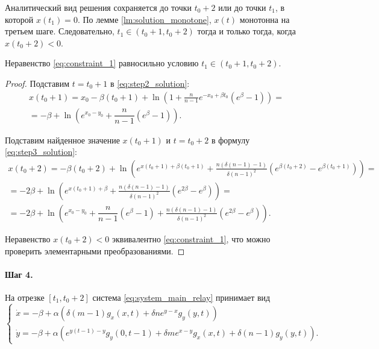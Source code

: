 Аналитический вид решения сохраняется до точки $t_0 + 2$ или до точки $t_1$, в которой $x(t_1) = 0$. По лемме \ref{lm:solution_monotone}, $x(t)$ монотонна на третьем шаге. Следовательно, $t_1 \in (t_0 + 1, t_0 + 2)$ тогда и только тогда, когда $x(t_0 + 2) < 0$.

\begin{lemma}
	\label{lm:t1_one_step}
	Неравенство \eqref{eq:constraint_1} равносильно условию $t_1 \in (t_0 + 1, t_0 + 2)$.
\end{lemma}
\begin{proof}
	Подставим $t = t_0 + 1$ в \eqref{eq:step2_solution}:
	\begin{multline*}
		x(t_0 + 1) = x_0 - \beta (t_0 + 1) + \ln\left(1 + \frac{n}{n - 1} e^{-x_0 + \beta t_0}  (e^{\beta} - 1)\right) =\\= -\beta + \ln\left(e^{x_0 - y_0} + \dfrac{n}{n - 1}(e^{\beta} - 1)\right).
	\end{multline*}
	
	Подставим найденное значение $x(t_0 + 1)$ и $t = t_0 + 2$ в формулу \eqref{eq:step3_solution}:
	\small
	\begin{multline*}
		x(t_0 + 2) = -\beta (t_0 + 2) + \ln\left(e^{x(t_0 + 1) + \beta (t_0 + 1)} + \frac{n (\delta(n - 1) - 1)}{\delta (n - 1)^2} (e^{\beta (t_0 + 2)} - e^{\beta (t_0 + 1)})\right) = \\ = -2\beta + \ln\left(e^{x(t_0 + 1) + \beta} + \frac{n (\delta(n - 1) - 1)}{\delta (n - 1)^2} (e^{2\beta} - e^{\beta})\right) = \\ = -2\beta + \ln\left(e^{x_0 - y_0} + \dfrac{n}{n - 1}(e^{\beta} - 1) + \frac{n (\delta(n - 1) - 1)}{\delta (n - 1)^2} (e^{2\beta} - e^{\beta})\right).
	\end{multline*}
	\normalsize
	
	Неравенство $x(t_0 + 2) < 0$ эквивалентно \eqref{eq:constraint_1}, что можно проверить элементарными преобразованиями.
\end{proof}

\paragraph{Шаг 4.} На отрезке $[t_1, t_0 + 2]$ система \eqref{eq:system_main_relay} принимает вид
\small
\begin{equation}
	\begin{cases}
		\dot{x} = -\beta + \alpha \left(\delta (m - 1) g_x(x, t) + \delta n e^{y - x} g_y(y, t)\right)\\
		\dot{y} = -\beta + \alpha \left(e^{y(t - 1) - y} g_y(0, t - 1) + \delta m e^{x - y} g_x(x, t) + \delta (n - 1) g_y(y, t)\right).
	\end{cases}
\end{equation}
\normalsize

